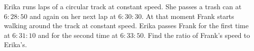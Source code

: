 Erika runs laps of a circular track at constant speed. She passes a trash can at $6{:}28{:}50$ and again on her next lap at $6{:}30{:}30$. At that moment Frank starts walking around the track at constant speed. Erika passes Frank for the first time at $6{:}31{:}10$ and for the second time at $6{:}33{:}50$. Find the ratio of Frank's speed to Erika's.
